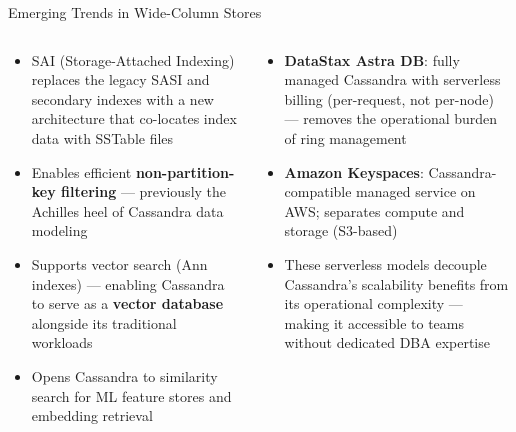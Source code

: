 \documentclass[aspectratio=169]{beamer}
\begin{document}
\begin{frame}{Emerging Trends in Wide-Column Stores}
  \begin{columns}[T]
      \begin{tcolorbox}[cassbox, title=Cassandra 5.0: Storage-Attached Indexing (SAI)]
        \small
        \begin{itemize}
          \item SAI (Storage-Attached Indexing) replaces the legacy SASI and secondary indexes with a new architecture that co-locates index data with SSTable files
          \item Enables efficient \textbf{non-partition-key filtering} — previously the Achilles heel of Cassandra data modeling
          \item Supports vector search (Ann indexes) — enabling Cassandra to serve as a \textbf{vector database} alongside its traditional workloads
          \item Opens Cassandra to similarity search for ML feature stores and embedding retrieval
        \end{itemize}
      \end{tcolorbox}
      \begin{tcolorbox}[cassbox, title=Cassandra \& the Serverless Future]
        \small
        \begin{itemize}
          \item \textbf{DataStax Astra DB}: fully managed Cassandra with serverless billing (per-request, not per-node) — removes the operational burden of ring management
          \item \textbf{Amazon Keyspaces}: Cassandra-compatible managed service on AWS; separates compute and storage (S3-based)
          \item These serverless models decouple Cassandra's scalability benefits from its operational complexity — making it accessible to teams without dedicated DBA expertise
        \end{itemize}
      \end{tcolorbox}
  \end{columns}
\end{frame}
\end{document}
